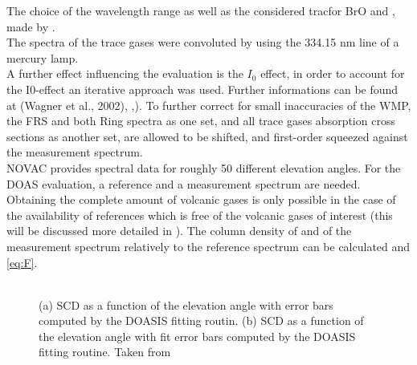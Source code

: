 \documentclass  [
  paper    = a4,
  BCOR     = 10mm,
  twoside,
  fontsize = 12pt,
  fleqn,
  toc      = bibnumbered,
  toc      = listofnumbered,
  numbers  = noendperiod,
  headings = normal,
  listof   = leveldown,
  version  = 3.03
]                                       {scrreprt}
\begin{document}
%
The choice of the wavelength range as well as the considered tracfor BrO and , made by \citet{vogel2011volcanic}.\\
The spectra of the trace gases were convoluted by using the 334.15 nm line of a mercury lamp.\\
A further effect influencing the evaluation is the $I_{0}$ effect, in order to account for the I0-effect \citep{platt2008differential} an iterative approach was used. Further informations can be found at (Wagner et al., 2002), \cite{lubcke2014bro},\cite{vogel2011volcanic}).
To further correct for small inaccuracies of the WMP, the FRS and both Ring spectra as one set, and all trace gases absorption cross sections as another set, are allowed to be shifted, and first-order squeezed against the measurement spectrum.\\
%
NOVAC provides spectral data for roughly 50 different elevation angles. For the DOAS evaluation, a reference and a measurement spectrum are needed. Obtaining the complete amount of volcanic gases is only possible in the case of the availability of references which is free of the volcanic gases of interest (this will be discussed more detailed in ). The column density of    and  of the measurement spectrum relatively to the reference spectrum can be calculated  and \ref{eq:F}. \\
\\
\begin{figure}
	\caption[(a)  SCD as a function of the elevation angle with error bars computed by the DOASIS fitting routin. (b)  SCD as a function of the elevation angle computed by the DOASIS fitting routine.  Taken from \cite{WarnachSimon}]{(a)  SCD as a function of the elevation angle with error bars computed by the DOASIS fitting routin. (b)  SCD as a function of the elevation angle with fit error bars computed by the DOASIS fitting routine.  Taken from \cite{WarnachSimon}}
	\label{fig:plumeref}
\end{figure}
\end{document}
